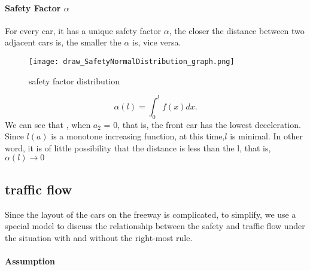 \paragraph{Safety Factor $\alpha$}
For every car, it has a unique safety factor $\alpha$, the closer the distance between two adjacent cars is, the smaller the $\alpha$ is, vice versa.\\
\begin{figure}[h]
\small
\centering
\texttt{[image: draw\_SafetyNormalDistribution\_graph.png]}
\caption{safety factor distribution} \label{fig::safety factor distribution}
\end{figure}
\begin{displaymath}
\alpha(l) = \int_{0}^{l} f(x) dx.
\end{displaymath}
We can see that , when $a_2$ = 0, that is, the front car has the lowest deceleration. Since $l(a)$ is a monotone increasing function, at this time,$l$ is minimal. In other word, it is of little possibility that the distance is less than the l, that is, $\alpha(l) \rightarrow 0$                     

\subsection{traffic flow}
Since the layout of the cars on the freeway is complicated, to simplify, we use a special model to discuss the relationship between the safety and traffic flow under the situation with and without the right-most rule.
\\
\paragraph{Assumption}


